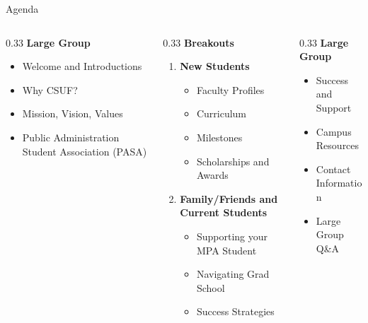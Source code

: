 \documentclass[10pt]{beamer}
\begin{document}
\begin{frame}{Agenda}
\begin{columns}[T,totalwidth=\textwidth]
  \begin{column}{0.33\textwidth}
    \textbf{Large Group}
    \begin{itemize}\setlength{\itemsep}{2pt}
      \item Welcome and Introductions
      \item Why CSUF?
      \item Mission, Vision, Values
      \item Public Administration Student Association (PASA)
    \end{itemize}
  \end{column}

  \begin{column}{0.33\textwidth}
    \textbf{Breakouts}
    \begin{enumerate}\setlength{\itemsep}{2pt}
      \item \textbf{New Students}
        \begin{itemize}\setlength{\itemsep}{1pt}
          \item Faculty Profiles
          \item Curriculum
          \item Milestones
          \item Scholarships and Awards
        \end{itemize}
      \item \textbf{Family/Friends and Current Students}
        \begin{itemize}\setlength{\itemsep}{1pt}
          \item Supporting your MPA Student
          \item Navigating Grad School
          \item Success Strategies
        \end{itemize}
    \end{enumerate}
  \end{column}

  \begin{column}{0.33\textwidth}
    \textbf{Large Group}
    \begin{itemize}\setlength{\itemsep}{2pt}
      \item Success and Support
      \item Campus Resources
      \item Contact Information
      \item Large Group Q\&A
    \end{itemize}
  \end{column}
\end{columns}
\end{frame}
\end{document}
